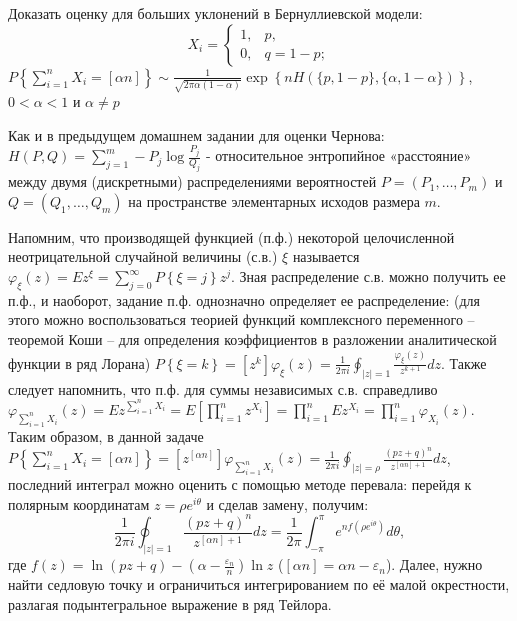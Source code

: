 \begin{problem}

Доказать оценку для больших уклонений в Бернуллиевской модели:
\[X_{i} =\left\{\begin{array}{cc} {1,} & {p,} \\ {0,} & {q=1-p;} \end{array}\right. \] 
$P\left\{\sum _{i=1}^{n}X_{i} =\left[\alpha n\right] \right\}\sim \frac{1}{\sqrt{2\pi \alpha (1-\alpha )} } \exp \left\{nH(\{ p,1-p\} ,\{ \alpha ,1-\alpha \} )\right\}$, $0<\alpha <1$ и $\alpha \ne p$

\noindent Как и в предыдущем домашнем задании для оценки Чернова: $H\left(P,Q\right)=\sum _{j=1}^{m}-P_{j} \log \frac{P_{j} }{Q_{j} }  $ - относительное энтропийное «расстояние» между двумя (дискретными) распределениями вероятностей $P=\left(P_{1} ,\ldots ,P_{m} \right)$ и $Q=\left(Q_{1} ,\ldots ,Q_{m} \right)$ на пространстве элементарных исходов размера $m$.

\begin{ordre}

Напомним, что производящей функцией (п.ф.) некоторой целочисленной неотрицательной случайной величины (с.в.) $\xi $ называется $\varphi _{\xi } (z)=Ez^{\xi } =\sum _{j=0}^{\infty }P\left\{\xi =j\right\} z^{j} $. Зная распределение с.в. можно получить ее п.ф., и наоборот, задание п.ф. однозначно определяет ее распределение: (для этого можно воспользоваться теорией функций комплексного переменного -- теоремой Коши -- для определения коэффициентов в разложении аналитической функции в ряд Лорана) $P\left\{\xi =k\right\}=\left[z^{k} \right]\varphi _{\xi } (z)=\frac{1}{2\pi i} \oint _{\left|z\right|=1}\frac{\varphi _{\xi } (z)}{z^{k+1} } dz $. Также следует напомнить, что п.ф. для суммы независимых с.в. справедливо $\varphi _{\sum _{i=1}^{n}X_{i}  } (z)=Ez^{\sum _{i=1}^{n}X_{i}  } =E\left[\prod _{i=1}^{n}z^{X_{i} }  \right]=\prod _{i=1}^{n}Ez^{X_{i} }  =\prod _{i=1}^{n}\varphi _{X_{i} } (z) $. Таким образом, в данной задаче $P\left\{\sum _{i=1}^{n}X_{i} =\left[\alpha n\right] \right\}=\left[z^{\left[\alpha n\right]} \right]\varphi _{\sum _{i=1}^{n}X_{i}  } (z)=\frac{1}{2\pi i} \oint _{\left|z\right|=\rho }\frac{\left(pz+q\right)^{n} }{z^{\left[\alpha n\right]+1} } dz $,\textbf{ }последний интеграл можно оценить с помощью методе перевала: перейдя к полярным координатам $z=\rho e^{i\theta } $ и сделав замену, получим:\textbf{}
\[\frac{1}{2\pi i} \oint _{\left|z\right|=1}\frac{\left(pz+q\right)^{n} }{z^{\left[\alpha n\right]+1} } dz =\frac{1}{2\pi } \int _{-\pi }^{\pi }e^{nf\left(\rho e^{i\theta } \right)} d\theta  ,\] 
где $f(z)=\ln \left(pz+q\right)-\left(\alpha -\frac{\varepsilon _{n} }{n} \right)\ln z$ ($\left[\alpha n\right]=\alpha n-\varepsilon _{n} $). Далее, нужно найти седловую точку и ограничиться интегрированием по её малой окрестности, разлагая подынтегральное выражение в ряд Тейлора.

\end{ordre}

\end{problem}